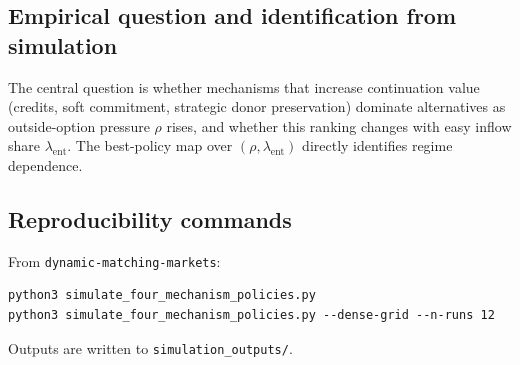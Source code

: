 \subsection{Empirical question and identification from simulation}

The central question is whether mechanisms that increase continuation value (credits, soft commitment, strategic donor preservation) dominate alternatives as outside-option pressure \(\rho\) rises, and whether this ranking changes with easy inflow share \(\lambda_{\mathrm{ent}}\). The best-policy map over \((\rho,\lambda_{\mathrm{ent}})\) directly identifies regime dependence.

\subsection{Reproducibility commands}

From \texttt{dynamic-matching-markets}:
\begin{verbatim}
python3 simulate_four_mechanism_policies.py
python3 simulate_four_mechanism_policies.py --dense-grid --n-runs 12
\end{verbatim}

Outputs are written to \texttt{simulation\_outputs/}.
